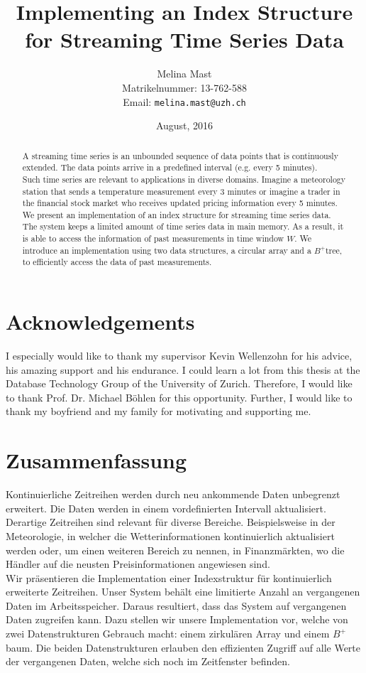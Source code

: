 \documentclass[abstracton,12pt,oneside]{scrreprt}
\title{Implementing an Index Structure for Streaming Time Series Data}
\author{
  Melina Mast\\[-5pt]
  \scriptsize Matrikelnummer: 13-762-588\\[-5pt]
  \scriptsize Email: \texttt{melina.mast@uzh.ch}
}
\date{\vspace*{2cm}August, 2016}
\begin{document}
\maketitle

\chapter*{Acknowledgements}
I especially would like to thank my supervisor Kevin Wellenzohn for his advice, his amazing support and his endurance. I could learn a lot from this thesis at the Database Technology Group of the University of Zurich. Therefore, I would like to thank Prof. Dr. Michael Böhlen for this opportunity. Further, I would like to thank my boyfriend and my family for motivating and supporting me.


\begin{abstract}
A streaming time series is an unbounded sequence of data points that is continuously extended. The data points arrive in a predefined interval (e.g. every 5 minutes). \\Such time series are relevant to applications in diverse domains. Imagine a meteorology station that sends a temperature measurement every 3 minutes or imagine a trader in the financial stock market who receives updated pricing information every 5 minutes.\\
We present an implementation of an index structure for streaming time series data. The system keeps a limited amount of time series data in main memory. As a result, it is able to access the information of past measurements in time window $W$. We introduce an implementation using two data structures, a circular array and a $B^+$tree, to efficiently access the data of past measurements. 

\end{abstract}

\chapter*{Zusammenfassung}
Kontinuierliche Zeitreihen werden durch neu ankommende Daten unbegrenzt erweitert. Die Daten werden in einem vordefinierten Intervall aktualisiert.\\
Derartige Zeitreihen sind relevant für diverse Bereiche. Beispielsweise in der Meteorologie, in welcher die Wetterinformationen kontinuierlich aktualisiert werden oder, um einen weiteren Bereich zu nennen, in Finanzmärkten, wo die Händler auf die neusten Preisinformationen angewiesen sind.\\
Wir präsentieren die Implementation einer Indexstruktur für kontinuierlich erweiterte Zeitreihen. Unser System behält eine limitierte Anzahl an vergangenen Daten im Arbeitsspeicher. Daraus resultiert, dass das System auf vergangenen Daten zugreifen kann. Dazu stellen wir unsere Implementation vor, welche von zwei Datenstrukturen Gebrauch macht: einem zirkulären Array und einem $B^+$baum. Die beiden Datenstrukturen erlauben den effizienten Zugriff auf alle Werte der vergangenen Daten, welche sich noch im Zeitfenster befinden.
\end{document}
